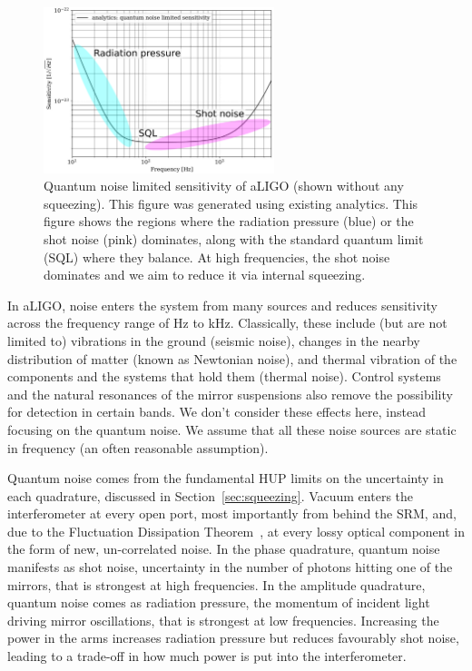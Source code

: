 \documentclass[aps,pra,superscriptaddress,reprint,nofootinbib]{revtex4-1}
\begin{document}
\begin{figure}[ht]%
	\begin{center}
	\includegraphics[width=0.6\textwidth]{figures/sqz_aLIGO_analytics_quantum_noise_budget-labelled.pdf}
	\end{center}
	\caption{Quantum noise limited sensitivity of aLIGO (shown without any squeezing). This figure was generated using existing analytics. This figure shows the regions where the radiation pressure (blue) or the shot noise (pink) dominates, along with the standard quantum limit (SQL) where they balance. At high frequencies, the shot noise dominates and we aim to reduce it via internal squeezing.}
	\label{fig:sqz_aLIGO_analytics_quantum_noise_budget}
\end{figure}


In aLIGO, noise enters the system from many sources and reduces sensitivity across the frequency range of Hz to kHz. Classically, these include (but are not limited to) vibrations in the ground (seismic noise), changes in the nearby distribution of matter (known as Newtonian noise), and thermal vibration of the components and the systems that hold them (thermal noise). Control systems and the natural resonances of the mirror suspensions also remove the possibility for detection in certain bands. We don’t consider these effects here, instead focusing on the quantum noise. We assume that all these noise sources are static in frequency (an often reasonable assumption). 


Quantum noise comes from the fundamental HUP limits on the uncertainty in each quadrature, discussed in Section~\ref{sec:squeezing}. Vacuum enters the interferometer at every open port, most importantly from behind the SRM, and, due to the Fluctuation Dissipation Theorem~\cite{Danilishin_2012}, at every lossy optical component in the form of new, un-correlated noise. In the phase quadrature, quantum noise manifests as shot noise, uncertainty in the number of photons hitting one of the mirrors, that is strongest at high frequencies. In the amplitude quadrature, quantum noise comes as radiation pressure, the momentum of incident light driving mirror oscillations, that is strongest at low frequencies. Increasing the power in the arms increases radiation pressure but reduces favourably shot noise, leading to a trade-off in how much power is put into the interferometer.
\end{document}

